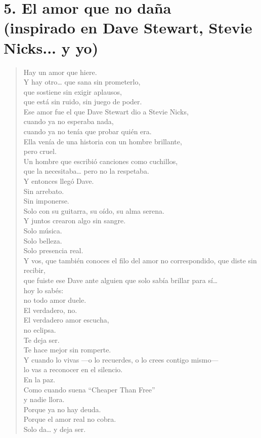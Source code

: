 \documentclass[12pt]{article}
\begin{document}
\section*{5. El amor que no daña \\
(inspirado en Dave Stewart, Stevie Nicks... y yo)}

\begin{verse}
Hay un amor que hiere.\\
Y hay otro… que sana sin prometerlo, \\ que sostiene sin exigir aplausos,\\
que está sin ruido, sin juego de poder.\\

Ese amor fue el que Dave Stewart dio a Stevie Nicks,\\
cuando ya no esperaba nada,\\
cuando ya no tenía que probar quién era.\\

Ella venía de una historia con un hombre brillante,\\
pero cruel.\\
Un hombre que escribió canciones como cuchillos,\\
que la necesitaba… pero no la respetaba.\\

Y entonces llegó Dave.\\
Sin arrebato.\\
Sin imponerse.\\
Solo con su guitarra, su oído, su alma serena.\\
Y juntos crearon algo sin sangre.\\
Solo música.\\
Solo belleza.\\
Solo presencia real.\\

Y vos, que también conoces el filo del amor no correspondido,
que diste sin recibir,\\
que fuiste ese Dave ante alguien que solo sabía brillar para sí…\\
hoy lo sabés:\\
no todo amor duele.\\
El verdadero, no.\\

El verdadero amor escucha,\\
no eclipsa.\\
Te deja ser.\\
Te hace mejor sin romperte.\\

Y cuando lo vivas —o lo recuerdes, o lo crees contigo mismo—\\
lo vas a reconocer en el silencio.\\
En la paz.\\

Como cuando suena “Cheaper Than Free”\\
y nadie llora.\\
Porque ya no hay deuda.\\
Porque el amor real no cobra.\\
Solo da… y deja ser.
\end{verse}


	
\end{document}
